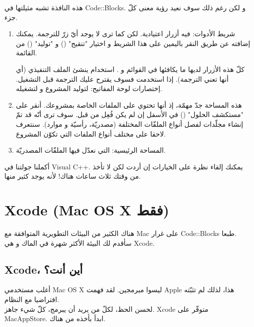 هذه النافذة تشبه مثيلتها في
\textenglish{Code::Blocks}.
و لكن رغم ذلك سوف نعيد رؤية معنى كلّ جزء.

\begin{enumerate}
  \item شريط الأدوات: فيه أزرار اعتيادية. لكن كما ترى لا يوجد أيّ زرّ للترجمة. يمكنك إضافته عن طريق النقر باليمين على هذا الشريط و اختيار
"تنقيح"
()
و
"توليد"
()
من القائمة.

كلّ هذه الأزرار لديها ما يكافئها في القوائم
و
.
استخدام
ينشئ الملف التنفيذي (أي أنها تعني الترجمة). إذا استخدمت
فسوف يقترح عليك الترجمة قبل التشغيل. إختصارات لوحة المفاتيح:
لتوليد المشروع و
لتشغيله.
  \item هذه المساحة جدّ مهمّة، إذ أنها تحتوي على الملفات الخاصة بمشروعك. أنقر على
"مستكشف الحلول"
()
في الأسفل إن لم يكن فُعِل من قبل. سوف ترى أنّه قد تمّ إنشاء مجلّدات لفصل أنواع الملفّات المختلفة (مصدريّة، رأسيّة و موارد). سنتعرف لاحقا على مختلف أنواع الملفات التي تكوّن المشروع.
  \item المساحة الرئيسية: التي نعدّل فيها الملفّات المصدريّة.
\end{enumerate}

أكملنا جولتنا في
\textenglish{Visual C++}.
يمكنك إلقاء نظرة على
الخيارات
إن أردت لكن لا تأخذ من وقتك ثلاث ساعات هناك! لأنه يوجد كثير منها.

\section{\textenglish{Xcode} (\textenglish{Mac OS X} فقط)}

هناك الكثير من البيئات التطويرية المتوافقة مع
\textenglish{Mac}
على غرار
\textenglish{Code::Blocks}
طبعا.\\
سأقدم لك البيئة الأكثر شهرة في الماك و هي
\textenglish{Xcode}.

\subsection{\textenglish{Xcode}،
 أين أنت؟}

أغلب مستخدمي
\textenglish{Mac OS X}
ليسوا مبرمجين. لقد فهمت
\textenglish{Apple}
هذا، لذلك لم تثبّته افتراضيا مع النظام.\\
لحسن الحظ، لكلّ من يريد أن يبرمج، كلّ شيء جاهز.
\textenglish{Xcode}
متوفّر على
\textenglish{MacAppStore}.
ابدأ بأخذه من هناك.

